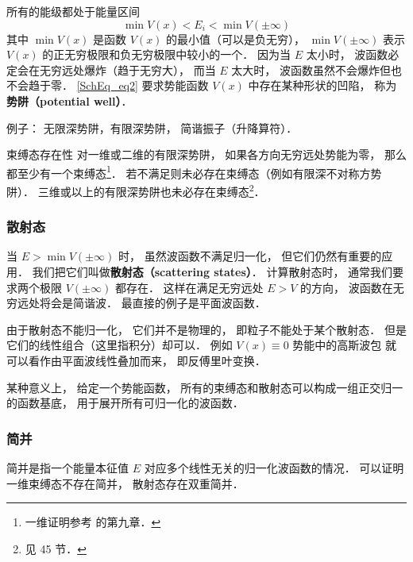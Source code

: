 所有的能级都处于能量区间
\begin{equation}\label{SchEq_eq2}
\min V(x) < E_i < \min V(\pm\infty)
\end{equation}
其中 $\min V(x)$ 是函数 $V(x)$ 的最小值（可以是负无穷）， $\min V(\pm\infty)$ 表示 $V(x)$ 的正无穷极限和负无穷极限中较小的一个． 因为当 $E$ 太小时， 波函数必定会在无穷远处爆炸（趋于无穷大）， 而当 $E$ 太大时， 波函数虽然不会爆炸但也不会趋于零． \autoref{SchEq_eq2} 要求势能函数 $V(x)$ 中存在某种形状的凹陷， 称为\textbf{势阱（potential well）}．

例子： 无限深势阱，有限深势阱， 简谐振子（升降算符）．

\begin{theorem}{束缚态存在性}
对一维或二维的有限深势阱， 如果各方向无穷远处势能为零， 那么都至少有一个束缚态\footnote{一维证明参考 \cite{Teschl} 的第九章．}． 若不满足则未必存在束缚态（例如有限深不对称方势阱）． 三维或以上的有限深势阱也未必存在束缚态\footnote{见 \cite{Landau} 45 节．}．
\end{theorem}

\subsubsection{散射态}
当 $E > \min V(\pm\infty)$ 时， 虽然波函数不满足归一化， 但它们仍然有重要的应用． 我们把它们叫做\textbf{散射态（scattering states）}． 计算散射态时， 通常我们要求两个极限 $V(\pm \infty)$ 都存在． 这样在满足无穷远处 $E > V$ 的方向， 波函数在无穷远处将会是简谐波． 最直接的例子是平面波函数． %

由于散射态不能归一化， 它们并不是物理的， 即粒子不能处于某个散射态．  但是它们的线性组合（这里指积分）却可以． 例如 $V(x) \equiv 0$ 势能中的高斯波包 就可以看作由平面波线性叠加而来， 即反傅里叶变换．

某种意义上， 给定一个势能函数， 所有的束缚态和散射态可以构成一组正交归一的函数基底， 用于展开所有可归一化的波函数．

\subsubsection{简并}
简并是指一个能量本征值 $E$ 对应多个线性无关的归一化波函数的情况． 可以证明一维束缚态不存在简并， 散射态存在双重简并．

